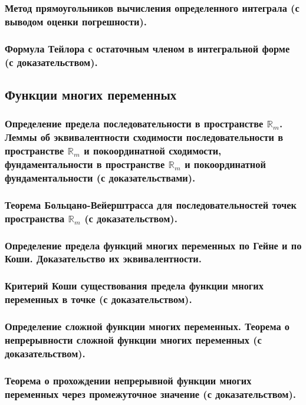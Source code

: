\documentclass[10pt]{article}
\begin{document}
    \subsubsection{Метод прямоугольников вычисления определенного интеграла (с выводом оценки погрешности).}
    \subsubsection{Формула Тейлора с остаточным членом в интегральной форме (с доказательством).}
    \subsection{Функции многих переменных}
    \subsubsection{Определение предела последовательности в пространстве $\mathbb{R}_m$. Леммы об эквивалентности сходимости последовательности в пространстве $\mathbb{R}_m$ и покоординатной сходимости, фундаментальности в пространстве $\mathbb{R}_m$ и покоординатной фундаментальности (с доказательствами).}
    \subsubsection{Теорема Больцано-Вейерштрасса для последовательностей точек пространства $\mathbb{R}_m$ (с доказательством).}
    \subsubsection{Определение предела функций многих переменных по Гейне и по Коши. Доказательство их эквивалентности.}
    \subsubsection{Критерий Коши существования предела функции многих переменных в точке (с доказательством).}
    \subsubsection{Определение сложной функции многих переменных. Теорема о непрерывности сложной функции многих переменных (с доказательством).}
    \subsubsection{Теорема о прохождении непрерывной функции многих переменных через промежуточное значение (с доказательством).}
\end{document}
